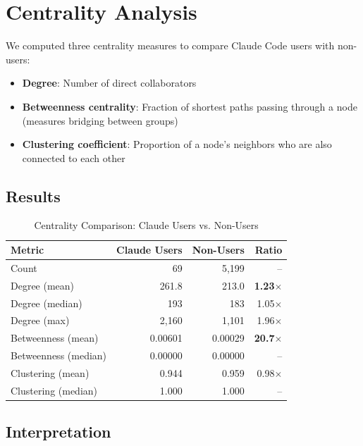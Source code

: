\documentclass[11pt]{article}
\begin{document}
\section{Centrality Analysis}

We computed three centrality measures to compare Claude Code users with non-users:

\begin{itemize}
    \item \textbf{Degree}: Number of direct collaborators
    \item \textbf{Betweenness centrality}: Fraction of shortest paths passing through a node (measures bridging between groups)
    \item \textbf{Clustering coefficient}: Proportion of a node's neighbors who are also connected to each other
\end{itemize}

\subsection{Results}

\begin{table}[H]
\centering
\caption{Centrality Comparison: Claude Users vs. Non-Users}
\label{tab:centrality}
\begin{tabular}{lrrr}
\toprule
\textbf{Metric} & \textbf{Claude Users} & \textbf{Non-Users} & \textbf{Ratio} \\
\midrule
Count & 69 & 5,199 & -- \\
\midrule
Degree (mean) & 261.8 & 213.0 & \textbf{1.23$\times$} \\
Degree (median) & 193 & 183 & 1.05$\times$ \\
Degree (max) & 2,160 & 1,101 & 1.96$\times$ \\
\midrule
Betweenness (mean) & 0.00601 & 0.00029 & \textbf{20.7$\times$} \\
Betweenness (median) & 0.00000 & 0.00000 & -- \\
\midrule
Clustering (mean) & 0.944 & 0.959 & 0.98$\times$ \\
Clustering (median) & 1.000 & 1.000 & -- \\
\bottomrule
\end{tabular}
\end{table}

\subsection{Interpretation}
\end{document}
